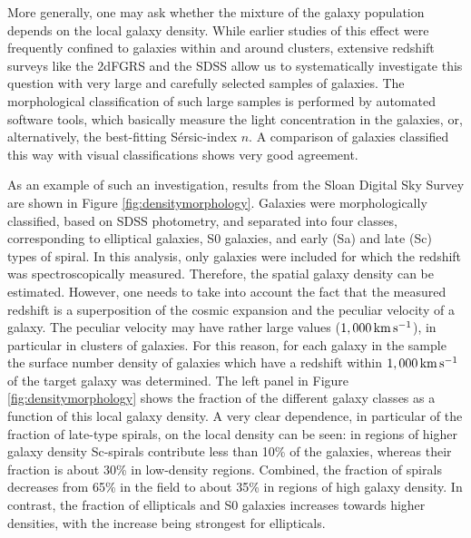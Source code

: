 \documentclass[a4paper,11pt]{article}
\begin{document}
{\noindent}More generally, one may ask whether the mixture of the galaxy population depends on the local galaxy density. While earlier studies of this effect were frequently confined to galaxies within and around clusters, extensive redshift surveys like the 2dFGRS and the SDSS allow us to systematically investigate this question with very large and carefully selected samples of galaxies. The morphological classification of such large samples is performed by automated software tools, which basically measure the light concentration in the galaxies, or, alternatively, the best-fitting S\'ersic-index $n$. A comparison of galaxies classified this way with visual classifications shows very good agreement.

{\noindent}As an example of such an investigation, results from the Sloan Digital Sky Survey are shown in Figure \ref{fig:densitymorphology}. Galaxies were morphologically classified, based on SDSS photometry, and separated into four classes, corresponding to elliptical galaxies, S0 galaxies, and early (Sa) and late (Sc) types of spiral. In this analysis, only galaxies were included for which the redshift was spectroscopically measured. Therefore, the spatial galaxy density can be estimated. However, one needs to take into account the fact that the measured redshift is a superposition of the cosmic expansion and the peculiar velocity of a galaxy. The peculiar velocity may have rather large values ($1,000\,{\rm km\,s^{-1}}$), in particular in clusters of galaxies. For this reason, for each galaxy in the sample the surface number density of galaxies which have a redshift within $1,000\,{\rm km\,s^{-1}}$ of the target galaxy was determined. The left panel in Figure \ref{fig:densitymorphology} shows the fraction of the different galaxy classes as a function of this local galaxy density. A very clear dependence, in particular of the fraction of late-type spirals, on the local density can be seen: in regions of higher galaxy density Sc-spirals contribute less than 10\% of the galaxies, whereas their fraction is about 30\% in low-density regions. Combined, the fraction of spirals decreases from 65\% in the field to about 35\% in regions of high galaxy density. In contrast, the fraction of ellipticals and S0 galaxies increases towards higher densities, with the increase being strongest for ellipticals.
\end{document}
